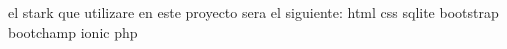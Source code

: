 el stark que utilizare en este proyecto sera el siguiente:
html
css
sqlite
bootstrap
bootchamp
ionic
php
